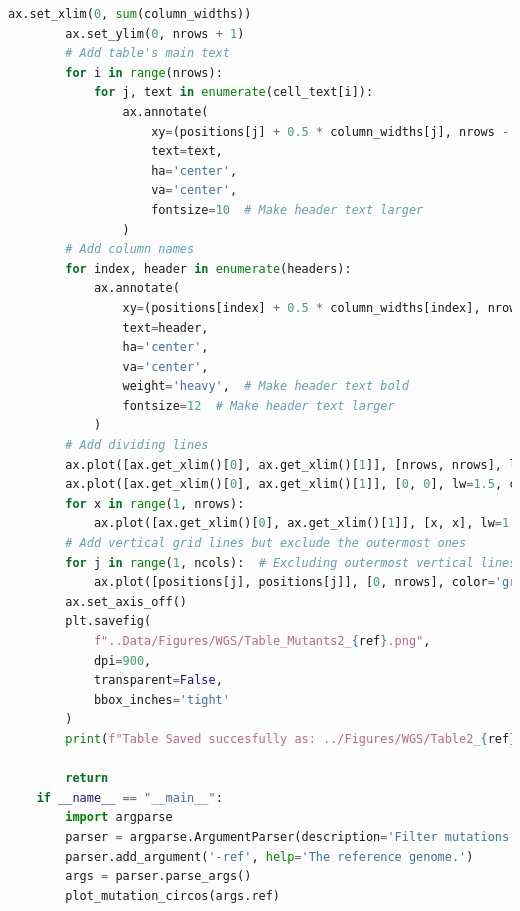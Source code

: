 \documentclass[12pt]{article}
\begin{document}
\begin{lstlisting}[language=Python]
        ax.set_xlim(0, sum(column_widths))
        ax.set_ylim(0, nrows + 1)
        # Add table's main text
        for i in range(nrows):
            for j, text in enumerate(cell_text[i]):
                ax.annotate(
                    xy=(positions[j] + 0.5 * column_widths[j], nrows - i - 0.5),  # Adjust Y position for text to align it in the center of the bounding box
                    text=text,
                    ha='center',
                    va='center',       
                    fontsize=10  # Make header text larger
                )
        # Add column names
        for index, header in enumerate(headers):
            ax.annotate(
                xy=(positions[index] + 0.5 * column_widths[index], nrows + 0.5),  # Adjust Y position for header text to align it in the center of the bounding box - for 20 mutation change 1 to 0.5
                text=header,
                ha='center',
                va='center',
                weight='heavy',  # Make header text bold
                fontsize=12  # Make header text larger
            )
        # Add dividing lines
        ax.plot([ax.get_xlim()[0], ax.get_xlim()[1]], [nrows, nrows], lw=1.5, color='black', marker='', zorder=4)
        ax.plot([ax.get_xlim()[0], ax.get_xlim()[1]], [0, 0], lw=1.5, color='black', marker='', zorder=4)
        for x in range(1, nrows):
            ax.plot([ax.get_xlim()[0], ax.get_xlim()[1]], [x, x], lw=1.15, color='gray', ls='--', zorder=3 , marker='')
        # Add vertical grid lines but exclude the outermost ones
        for j in range(1, ncols):  # Excluding outermost vertical lines
            ax.plot([positions[j], positions[j]], [0, nrows], color='gray', linewidth=1.15, ls='--', zorder=3 , marker='')
        ax.set_axis_off()
        plt.savefig(
            f"..Data/Figures/WGS/Table_Mutants2_{ref}.png",
            dpi=900,
            transparent=False,
            bbox_inches='tight'
        )
        print(f"Table Saved succesfully as: ../Figures/WGS/Table2_{ref}.png")

        return
    if __name__ == "__main__":
        import argparse
        parser = argparse.ArgumentParser(description='Filter mutations and plot a circos diagram.')
        parser.add_argument('-ref', help='The reference genome.')
        args = parser.parse_args()
        plot_mutation_circos(args.ref)
\end{lstlisting}
\end{document}
